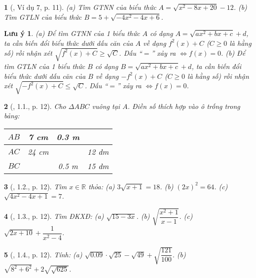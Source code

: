 \documentclass{article}
\newtheorem{baitoan}{}%
\newtheorem{luuy}{Lưu ý}
\begin{document}
\begin{baitoan}[\cite{Binh_boi_duong_Toan_9_tap_1}, Ví dụ 7, p. 11]
	(a) Tìm {\rm GTNN} của biểu thức $A = \sqrt{x^2 - 8x + 20} - 12$. (b) Tìm {\rm GTLN} của biểu thức $B = 5 + \sqrt{-4x^2 - 4x + 6}$.
\end{baitoan}

\begin{luuy}
	(a) Để tìm {\rm GTNN} của 1 biểu thức $A$ có dạng $A = \sqrt{ax^2 + bx + c} + d$, ta cần biến đổi biểu thức dưới dấu căn của $A$ về dạng $f^2(x) + C$ ($C\ge0$ là hằng số) rồi nhận xét $\sqrt{f^2(x) + C}\ge\sqrt{C}$. Dấu ``$=$'' xảy ra $\Leftrightarrow f(x) = 0$. (b) Để tìm {\rm GTLN} của 1 biểu thức $B$ có dạng $B = \sqrt{ax^2 + bx + c} + d$, ta cần biến đổi biểu thức dưới dấu căn của $B$ về dạng $-f^2(x) + C$ ($C\ge0$  là hằng số) rồi nhận xét $\sqrt{-f^2(x) + C}\le\sqrt{C}$. Dấu ``$=$'' xảy ra $\Leftrightarrow f(x) = 0$.
\end{luuy}

\begin{baitoan}[\cite{Binh_boi_duong_Toan_9_tap_1}, 1.1., p. 12]
	Cho $\Delta ABC$ vuông tại $A$. Điền số thích hợp vào ô trống trong bảng:
	\begin{table}[H]
		\centering
		\begin{tabular}{|c|c|c|c|}
			\hline
			$AB$ & 7 cm & 0.3 m &  \\
			\hline
			$AC$ & 24 cm &  & 12 dm \\
			\hline
			$BC$ &  & 0.5 m & 15 dm \\
			\hline
		\end{tabular}
	\end{table}
\end{baitoan}

\begin{baitoan}[\cite{Binh_boi_duong_Toan_9_tap_1}, 1.2., p. 12]
	Tìm $x\in\mathbb{R}$ thỏa: (a) $3\sqrt{x + 1} = 18$. (b) $(2x)^2 = 64$. (c) $\sqrt{4x^2 - 4x + 1} = 7$.
\end{baitoan}

\begin{baitoan}[\cite{Binh_boi_duong_Toan_9_tap_1}, 1.3., p. 12]
	Tìm {\rm ĐKXĐ}: (a) $\sqrt{15 - 3x}$. (b) $\sqrt{\dfrac{x^2 + 1}{x - 1}}$. (c) $\sqrt{2x + 10} + \dfrac{1}{x^2 - 4}$.
\end{baitoan}

\begin{baitoan}[\cite{Binh_boi_duong_Toan_9_tap_1}, 1.4., p. 12]
	Tính: (a) $\sqrt{0.09}\cdot\sqrt{25} - \sqrt{49} + \sqrt{\dfrac{121}{100}}$. (b) $\sqrt{8^2 + 6^2} + 2\sqrt{\sqrt{625}}$.
\end{baitoan}
\end{document}
